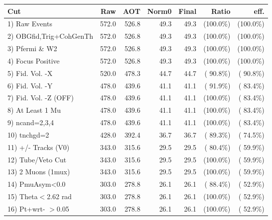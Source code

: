  \begin{table}[h!]\centering
 \begin{tabular}{||l||r|r|r|r|r|r||}
 \hline
 \hline
 Cut & Raw & AOT & Norm0 & Final & Ratio & eff.       \\
 \hline
  1) Raw Events           &        572.0 &        526.8 &         49.3 &         49.3 & (100.0\%) & (100.0\%) \\
  2) OBGfid,Trig+CohGenTh &        572.0 &        526.8 &         49.3 &         49.3 & (100.0\%) & (100.0\%) \\
  3) Pfermi \& W2         &        572.0 &        526.8 &         49.3 &         49.3 & (100.0\%) & (100.0\%) \\
  4) Focus Positive       &        572.0 &        526.8 &         49.3 &         49.3 & (100.0\%) & (100.0\%) \\
  5) Fid. Vol. -X         &        520.0 &        478.3 &         44.7 &         44.7 & ( 90.8\%) & ( 90.8\%) \\
  6) Fid. Vol. -Y         &        478.0 &        439.6 &         41.1 &         41.1 & ( 91.9\%) & ( 83.4\%) \\
  7) Fid. Vol. -Z (OFF)   &        478.0 &        439.6 &         41.1 &         41.1 & (100.0\%) & ( 83.4\%) \\
  8) At Least 1 Mu        &        478.0 &        439.6 &         41.1 &         41.1 & (100.0\%) & ( 83.4\%) \\
  9) ncand=2,3,4          &        478.0 &        439.6 &         41.1 &         41.1 & (100.0\%) & ( 83.4\%) \\
 10) tnchgd=2             &        428.0 &        392.4 &         36.7 &         36.7 & ( 89.3\%) & ( 74.5\%) \\
 11) +/- Tracks (V0)      &        343.0 &        315.6 &         29.5 &         29.5 & ( 80.4\%) & ( 59.9\%) \\
 12) Tube/Veto Cut        &        343.0 &        315.6 &         29.5 &         29.5 & (100.0\%) & ( 59.9\%) \\
 13) 2 Muons (1mux)       &        343.0 &        315.6 &         29.5 &         29.5 & (100.0\%) & ( 59.9\%) \\
 14) PmuAsym<0.0          &        303.0 &        278.8 &         26.1 &         26.1 & ( 88.4\%) & ( 52.9\%) \\
 15) Theta$<$2.62 rad     &        303.0 &        278.8 &         26.1 &         26.1 & (100.0\%) & ( 52.9\%) \\
 16) Pt+wrt- $>$0.05      &        303.0 &        278.8 &         26.1 &         26.1 & (100.0\%) & ( 52.9\%) \\

\end{tabular}
\end{table}
